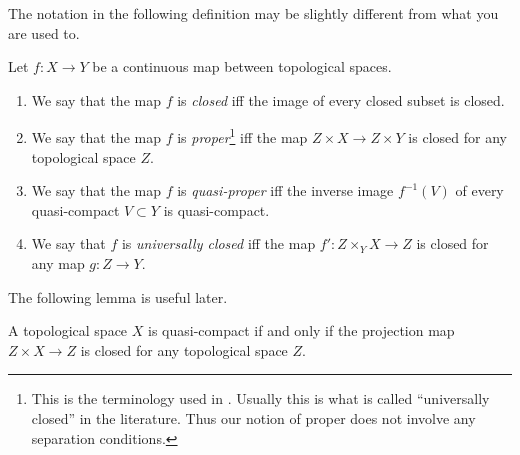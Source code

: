 \noindent
The notation in the following definition may be slightly different
from what you are used to.

\begin{definition}
\label{definition-proper-map}
Let $f : X\to Y$ be a continuous map between topological spaces.
\begin{enumerate}
\item We say that the map $f$ is {\it closed}
iff the image of every closed subset is closed.
\item We say that the map $f$ is {\it proper}\footnote{This is the
terminology used in \cite{Bourbaki}. Usually this is what
is called ``universally closed'' in the literature. Thus our notion
of proper does not involve any separation conditions.} iff
the map $Z \times X\to Z \times Y$ is closed for any topological space
$Z$.
\item We say that the map $f$ is {\it quasi-proper} iff
the inverse image $f^{-1}(V)$ of every quasi-compact $V \subset
Y$ is quasi-compact.
\item We say that $f$ is {\it universally closed} iff
the map $f': Z \times_Y X \to Z$ is closed for any map $g: Z \to Y$.
\end{enumerate}
\end{definition}

\noindent
The following lemma is useful later.

\begin{lemma}
\label{lemma-characterize-quasi-compact}
A topological space $X$ is quasi-compact if and only if the
projection map $Z \times X \to Z$ is closed for
any topological space $Z$.
\end{lemma}

